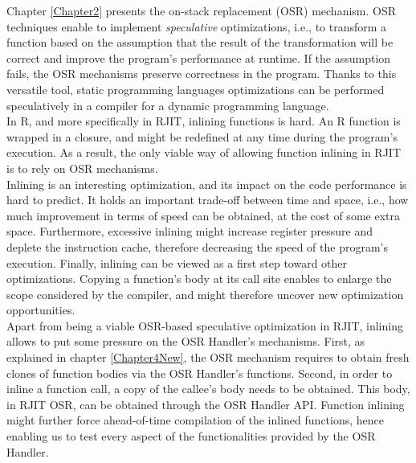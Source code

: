 Chapter \ref{Chapter2} presents the on-stack replacement (OSR) mechanism.
OSR techniques enable to implement \textit{speculative} optimizations, i.e., to transform a function based on the assumption that the result of the transformation will be correct and improve the program's performance at runtime.
If the assumption fails, the OSR mechanisms preserve correctness in the program.
Thanks to this versatile tool, static programming languages optimizations can be performed speculatively in a compiler for a dynamic programming language.\\

In R, and more specifically in RJIT, inlining functions is hard. 
An R function is wrapped in a closure, and might be redefined at any time during the program's execution.
As a result, the only viable way of allowing function inlining in RJIT is to rely on OSR mechanisms.\\

Inlining is an interesting optimization, and its impact on the code performance is hard to predict. 
It holds an important trade-off between time and space, i.e., how much improvement in terms of speed can be obtained, at the cost of some extra space.
Furthermore, excessive inlining might increase register pressure and deplete the instruction cache, therefore decreasing the speed of the program's execution.
Finally, inlining can be viewed as a first step toward other optimizations.
Copying a function's body at its call site enables to enlarge the scope considered by the compiler, and might therefore uncover new optimization opportunities.\\

Apart from being a viable OSR-based speculative optimization in RJIT, inlining allows to put some pressure on the OSR Handler's mechanisms.
First, as explained in chapter \ref{Chapter4New}, the OSR mechanism requires to obtain fresh clones of function bodies via the OSR Handler's functions.
Second, in order to inline a function call, a copy of the callee's body needs to be obtained.
This body, in RJIT OSR, can be obtained through the OSR Handler API.
Function inlining might further force ahead-of-time compilation of the inlined functions, hence enabling us to test every aspect of the functionalities provided by the OSR Handler.\\

